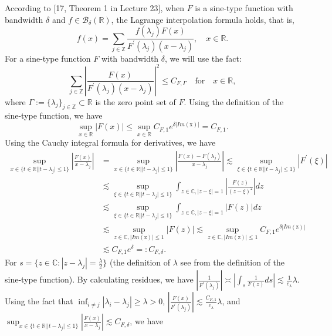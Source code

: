 \documentclass[a4paper]{article}
\numberwithin{equation}{section}
\begin{document}
According to  [17, Theorem 1 in Lecture 23], when $F$ is a sine-type function with bandwidth $\delta$ and $f\in \mathcal{B}_{\delta}(\mathbb{R})$, the Lagrange interpolation formula holds, that is, $$f(x)=\sum_{j\in\mathbb{Z}} \frac{f(\lambda_{j})F(x)}{F^{'}(\lambda_{j})(x-\lambda_{j})}, \quad x\in \mathbb{R}.$$
For a sine-type function $F$ with bandwidth $\delta$, we will use the fact:  \begin{equation}\label{eq13}
\sum_{j\in\mathbb{Z}} \left|\frac{F(x)}{F^{'}(\lambda_{j})(x-\lambda_{j})}\right|^2\le C_{F, \Gamma} \quad \text{for} \quad x\in \mathbb{R},\end{equation}
where $\Gamma:=\{\lambda_{j}\}_{j\in \mathbb{Z}}\subset \mathbb{R}$ is the zero point set of $F$.   Using the definition of the sine-type function, we have 
$$\sup_{x\in \mathbb{R}}|F(x)|\le \sup_{x\in \mathbb{R}}C_{F,1}e^{\delta|Im(\mathrm x)|} =C_{F,1} .$$  Using the Cauchy integral formula for derivatives, we have \begin{equation*}
\begin{split}
\sup_{x\in\{t\in\mathbb{R}||t-\lambda_{j}|\le1\}}\left|\frac{F(x)}{x-\lambda_{j}}\right|&= \sup_{x\in\{t\in\mathbb{R}||t-\lambda_{j}|\le1\}}\left|\frac{F(x)-F(\lambda_{j})}{ x-\lambda_{j}}\right|\lesssim\sup_{\xi\in\{t\in\mathbb{R}||t-\lambda_{j}|\le1\}}\left|F^{'}(\xi)\right|\\&\lesssim \sup_{\xi\in\{t\in\mathbb{R}||t-\lambda_{j}|\le1\}}\int_{z\in\mathbb{C},|z-\xi|=1}\left|\frac{F(z)}{(z-\xi)^2}\right|dz\\&\lesssim \sup_{\xi\in\{t\in\mathbb{R}||t-\lambda_{j}|\le1\}}\int_{z\in\mathbb{C},|z-\xi|=1}\left| F(z) \right|dz\\&\lesssim  \sup_{z\in\mathbb{C},|Im(\mathrm z)|\le 1}|F(z)|
\lesssim \sup_{z\in\mathbb{C},|Im(\mathrm z)|\le 1}C_{F,1}e^{\delta|Im(\mathrm z)|}\\&\lesssim  C_{F,1}e^{\delta }=: C_{F,\delta}.\end{split}\end{equation*} For $s=\{z\in\mathbb{C}:|z-\lambda_{j}|=\frac{\lambda}{2}\}$ (the definition of $\lambda$ see from the definition of the sine-type function). By calculating residues, we have 
$|\frac{1}{F^{'}(\lambda_j)}|\asymp|\int_{s}\frac{1}{F(z)}ds |\lesssim \frac{1}{c_{\lambda}}\lambda$. Using the fact that $\inf_{i\neq j }|\lambda_{i}-\lambda_{j}|\ge\lambda>0$, $|\frac{F(x)}{F^{'}(\lambda_j)}|\lesssim \frac{C_{F,1}}{c_{\lambda}}\lambda$, and $\sup_{x\in\{t\in\mathbb{R}||t-\lambda_{j}|\le1\}}\left|\frac{F(x)}{x-\lambda_{j}}\right|\lesssim C_{F,\delta}$, we have
\end{document}
